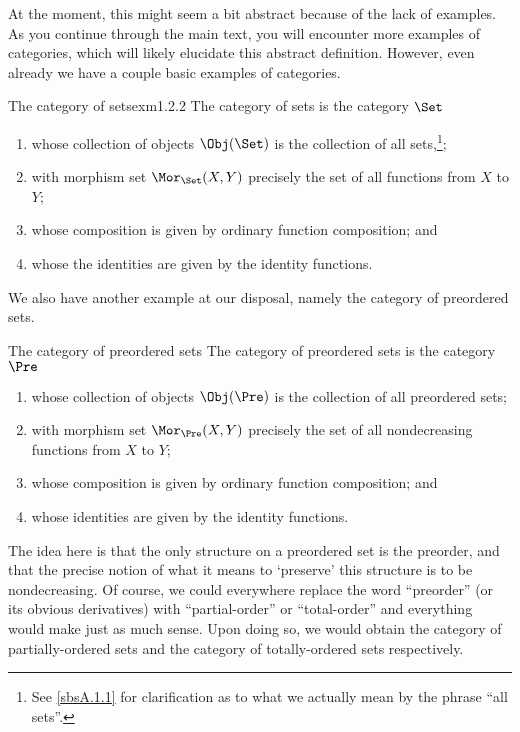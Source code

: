At the moment, this might seem a bit abstract because of the lack of examples.  As you continue through the main text, you will encounter more examples of categories, which will likely elucidate this abstract definition.  However, even already we have a couple basic examples of categories.
\begin{exm}{The category of sets}{exm1.2.2}
The category of sets is the category $\Set$\index[notation]{$\Set$}
\begin{enumerate}
\item whose collection of objects $\Obj (\Set )$ is the collection of all sets,\footnote{See \cref{sbsA.1.1} for clarification as to what we actually mean by the phrase ``all sets''.};
\item with morphism set $\Mor _{\Set}(X,Y)$ precisely the set of all functions from $X$ to $Y$;
\item whose composition is given by ordinary function composition; and
\item whose the identities are given by the identity functions.
\end{enumerate}
\end{exm}
We also have another example at our disposal, namely the category of preordered sets.
\begin{exm}{The category of preordered sets}{}
The category of preordered sets is the category $\Pre$\index[notation]{$\Pre$}
\begin{enumerate}
\item whose collection of objects $\Obj (\Pre )$ is the collection of all preordered sets;
\item with morphism set $\Mor _{\Pre}(X,Y)$ precisely the set of all nondecreasing functions from $X$ to $Y$;
\item whose composition is given by ordinary function composition; and
\item whose identities are given by the identity functions.
\end{enumerate}
\end{exm}
The idea here is that the only structure on a preordered set is the preorder, and that the precise notion of what it means to `preserve' this structure is to be nondecreasing.  Of course, we could everywhere replace the word ``preorder'' (or its obvious derivatives) with ``partial-order'' or ``total-order'' and everything would make just as much sense.  Upon doing so, we would obtain the category of partially-ordered sets and the category of totally-ordered sets respectively.

